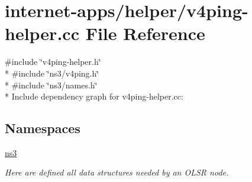 \hypertarget{v4ping-helper_8cc}{}\section{internet-\/apps/helper/v4ping-\/helper.cc File Reference}
\label{v4ping-helper_8cc}
{\ttfamily \#include \char`\"{}v4ping-\/helper.\+h\char`\"{}}\\*
{\ttfamily \#include \char`\"{}ns3/v4ping.\+h\char`\"{}}\\*
{\ttfamily \#include \char`\"{}ns3/names.\+h\char`\"{}}\\*
Include dependency graph for v4ping-\/helper.cc\+:
\subsection*{Namespaces}
\begin{DoxyCompactItemize}
\item 
 \hyperlink{namespacens3}{ns3}
\begin{DoxyCompactList}\small\item\em Here are defined all data structures needed by an O\+L\+SR node. \end{DoxyCompactList}\end{DoxyCompactItemize}
